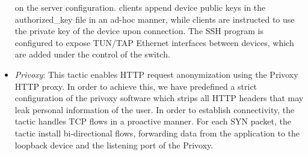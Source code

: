 \begin{itemize}
    on the server configuration. 
    \signpost clients append device public keys
    in the authorized\_key file in an ad-hoc manner, while clients are
    instructed to use the private key of the device upon connection. The SSH
    program is configured to expose TUN/TAP Ethernet interfaces between
    devices, which are added under the control of the \of switch.
  \item \emph{Privoxy}: This tactic enables HTTP request anonymization using 
    the Privoxy~\cite{privoxy} HTTP proxy. In order to achieve this, we have predefined a
    strict configuration of the privoxy software which strips all HTTP headers
    that may leak personal information of the user. In order to establish
    connectivity, the tactic handles TCP flows in a proactive manner. For each
    SYN packet, the tactic install bi-directional  flows, forwarding data from the
    application to the loopback device and the listening port of the Privoxy.


\end{itemize}
